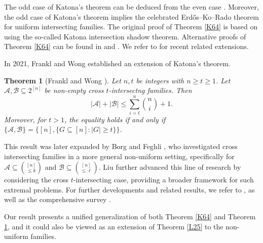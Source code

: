 \documentclass[11pt,a4paper]{article}
\newtheorem{theorem}{Theorem}[section]
\begin{document}
The odd case of Katona's theorem can be deduced from the even case \cite{AK1999}. Moreover, the odd case of Katona's theorem implies the celebrated Erd\H{o}s--Ko--Rado theorem for uniform intersecting families. 
The original proof of Theorem \ref{K64} is based on using the so-called Katona intersection shadow theorem. 
Alternative proofs of Theorem \ref{K64} can be found in \cite{AK1999,AK2005,Wang1977} and \cite[page 98]{Bol1986}. We refer to \cite{Fra2017jctb,Fra2017cpc,HKP2020,LW2024,WFL2025} for  recent related extensions.  


In 2021, 
 Frankl and Wong \cite{FW21} established an extension of Katona's theorem.

\begin{theorem}[Frankl  and Wong \cite{FW21}] \label{FW21}
Let $n, t$ be integers with $n \geq  t\geq  1$.  Let $\mathcal{A},\mathcal{B} \subseteq 2^{[n]}$ be  non-empty cross $t$-intersectng families. Then
$$
|\mathcal{A}|+|\mathcal{B}| \leq \sum_{i=t}^n\binom{n}{i}+1.
$$
Moreover, for $t>1$, the equality holds if and only if $\{\mathcal{A}, \mathcal{B}\}=\{[n],\{G \subseteq [n]: |G|\geq  t\}\}$.
\end{theorem}

This result was later expanded by Borg and Feghli \cite{B22}, who investigated cross intersecting families in a more general non-uniform setting, specifically for $\mathcal{A} \subseteq \binom{[n]}{\leq k}$ and $\mathcal{B} \subseteq \binom{[n]}{\leq \ell}$. Liu \cite{L23} further advanced this line of research by considering the cross $t$-intersecting case, providing a broader framework for such extremal problems. For further developments and related results, we refer to \cite{F17, FT18, G23, H25, JXXZ2024}, as well as the comprehensive survey \cite{FT16}.  


 


Our result presents a unified generalization of both Theorem \ref{K64} and Theorem \ref{FW21}, and it could also be viewed as an extension of Theorem \ref{L25} to the non-uniform families. 
\end{document}
